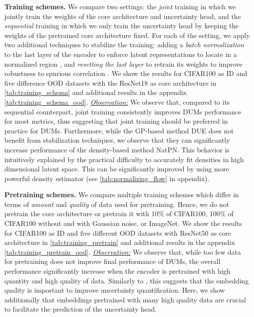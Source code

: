 \textbf{Training schemes.} We compare two settings: the \textit{joint} training in which we jointly train the weights of the core architecture and uncertainty head, and the \textit{sequential} training in which we only train the uncertainty head by keeping the weights of the pretrained core architecture fixed. For each of the setting, we apply two additional techniques to stabilize the training: adding a \textit{batch normalization} to the last layer of the encoder to enforce latent representations to locate in a normalized region \citep{ioffe2015bn,NatPN2021}, and \textit{resetting the last layer} to retrain its weights to improve robustness to spurious correlation \citep{kirichenko2022reset}. We show the results for CIFAR100 as ID and five difference OOD datasets with the ResNet18 as core architecture in \cref{tab:training_schema} and additional results in the appendix \cref{tab:training_schema_ood}.
\underline{\textit{Observation:}} We observe that, compared to its sequential counterpart, joint training consistently improves DUMs performance for most metrics, thus suggesting that joint training should be preferred in practice for DUMs. Furthermore, while the GP-based method DUE does not benefit from stabilization techniques, we observe that they can significantly increase performance of the density-based method NatPN. This behavior is intuitively explained by the practical difficulty to accurately fit densities in high dimensional latent space. This can be significantly improved by using more powerful density estimator (see \cref{tab:normalizing_flow} in appendix).

\textbf{Pretraining schemes.} We compare multiple training schemes which differ in terms of \emph{amount} and \emph{quality} of data used for pretraining. Hence, we do not pretrain the core architecture or pretrain it with 10\% of CIFAR100, 100\% of CIFAR100 without and with Gaussian noise, or ImageNet. We show the results for CIFAR100 as ID and five different OOD datasets with ResNet50 as core architecture in \cref{tab:training_pretrain} and additional results in the appendix \cref{tab:training_pretrain_ood}.
\underline{\textit{Observation:}} We observe that, while too few data for pretraining does not improve final performance of DUMs, the overall performance significantly increase when the encoder is pretrained with high quantity and high quality of data.  Similarly to \citet{why-nf-fail-ood}, this suggests that the embedding quality is important to improve uncertainty quantification. Here, we show additionally that embeddings pretrained with many high quality data are crucial to facilitate the prediction of the uncertainty head.



